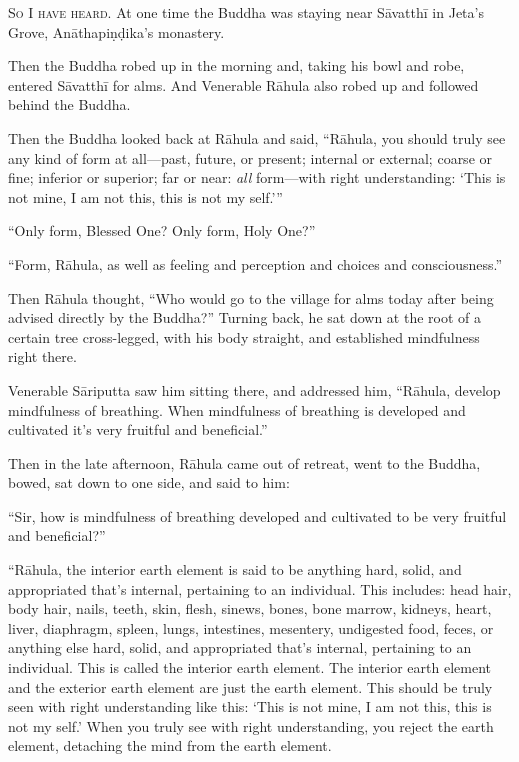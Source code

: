 \documentclass[12pt,openany]{book}%
\newcommand*{\scevam}[1]{\textsc{#1}}
\begin{document}
\scevam{So I have heard. }At one time the Buddha was staying near \textsanskrit{Sāvatthī} in Jeta’s Grove, \textsanskrit{Anāthapiṇḍika}’s monastery. 

Then the Buddha robed up in the morning and, taking his bowl and robe, entered \textsanskrit{Sāvatthī} for alms. And Venerable \textsanskrit{Rāhula} also robed up and followed behind the Buddha. 

Then the Buddha looked back at \textsanskrit{Rāhula} and said, “\textsanskrit{Rāhula}, you should truly see any kind of form at all—past, future, or present; internal or external; coarse or fine; inferior or superior; far or near: \emph{all} form—with right understanding: ‘This is not mine, I am not this, this is not my self.’” 

“Only form, Blessed One? Only form, Holy One?” 

“Form, \textsanskrit{Rāhula}, as well as feeling and perception and choices and consciousness.” 

Then \textsanskrit{Rāhula} thought, “Who would go to the village for alms today after being advised directly by the Buddha?” Turning back, he sat down at the root of a certain tree cross-legged, with his body straight, and established mindfulness right there. 

Venerable \textsanskrit{Sāriputta} saw him sitting there, and addressed him, “\textsanskrit{Rāhula}, develop mindfulness of breathing. When mindfulness of breathing is developed and cultivated it’s very fruitful and beneficial.” 

Then in the late afternoon, \textsanskrit{Rāhula} came out of retreat, went to the Buddha, bowed, sat down to one side, and said to him: 

“Sir, how is mindfulness of breathing developed and cultivated to be very fruitful and beneficial?” 

“\textsanskrit{Rāhula}, the interior earth element is said to be anything hard, solid, and appropriated that’s internal, pertaining to an individual. This includes: head hair, body hair, nails, teeth, skin, flesh, sinews, bones, bone marrow, kidneys, heart, liver, diaphragm, spleen, lungs, intestines, mesentery, undigested food, feces, or anything else hard, solid, and appropriated that’s internal, pertaining to an individual. This is called the interior earth element. The interior earth element and the exterior earth element are just the earth element. This should be truly seen with right understanding like this: ‘This is not mine, I am not this, this is not my self.’ When you truly see with right understanding, you reject the earth element, detaching the mind from the earth element. 
\end{document}
